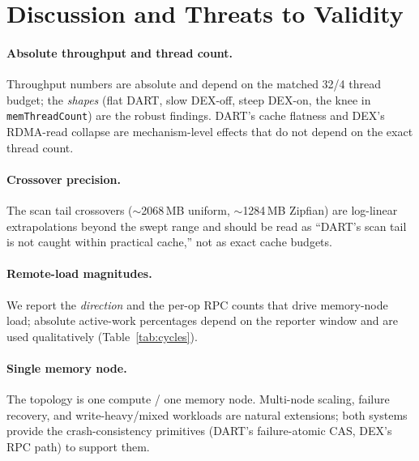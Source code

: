 \documentclass[sigconf,nonacm]{acmart}
\begin{document}
\section{Discussion and Threats to Validity}
\label{sec:disc}
\paragraph{Absolute throughput and thread count.}
Throughput numbers are absolute and depend on the matched 32/4 thread budget;
the \emph{shapes} (flat DART, slow DEX-off, steep DEX-on, the knee in
\texttt{memThreadCount}) are the robust findings. DART's cache flatness and DEX's
RDMA-read collapse are mechanism-level effects that do not depend on the exact
thread count.

\paragraph{Crossover precision.}
The scan tail crossovers ($\sim$2068\,MB uniform, $\sim$1284\,MB Zipfian) are
log-linear extrapolations beyond the swept range and should be read as ``DART's
scan tail is not caught within practical cache,'' not as exact cache budgets.

\paragraph{Remote-load magnitudes.}
We report the \emph{direction} and the per-op RPC counts that drive memory-node
load; absolute active-work percentages depend on the reporter window and are used
qualitatively (Table~\ref{tab:cycles}).

\paragraph{Single memory node.}
The topology is one compute / one memory node. Multi-node scaling, failure
recovery, and write-heavy/mixed workloads are natural extensions; both systems
provide the crash-consistency primitives (DART's failure-atomic CAS, DEX's RPC
path) to support them.

\end{document}
